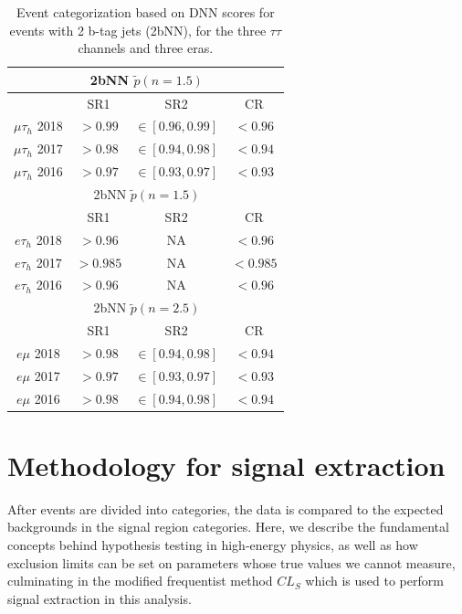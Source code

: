 \begin{table}[h!]
    \begin{center}
       \begin{tabular}{|c|c|c|c|}
       \hline
        & \multicolumn{2}{c}{2bNN $\tilde{p}(n=1.5)$} & \\
       \hline
        & SR1 & SR2 & CR \\
       \hline
       $\mu\tau_{h}$ 2018 & $>0.99$ & $\in[0.96,0.99]$ & $<0.96$ \\
       $\mu\tau_{h}$ 2017 & $>0.98$ & $\in[0.94,0.98]$ & $<0.94$ \\
       $\mu\tau_{h}$ 2016 & $>0.97$ & $\in[0.93,0.97]$ & $<0.93$ \\
       \hline
       \hline
        & \multicolumn{2}{c}{2bNN $\tilde{p}(n=1.5)$} & \\
       \hline
        & SR1 & SR2 & CR \\
       \hline
       $e\tau_{h}$ 2018 & $>0.96$ & NA & $<0.96$ \\
       $e\tau_{h}$ 2017 & $>0.985$ & NA & $<0.985$ \\
       $e\tau_{h}$ 2016 & $>0.96$ & NA & $<0.96$ \\
       \hline
       \hline
        & \multicolumn{2}{c}{2bNN $\tilde{p}(n=2.5)$} & \\
       \hline
        & SR1 & SR2 & CR \\
       \hline
       $e\mu$ 2018 & $>0.98$ & $\in[0.94,0.98]$ & $<0.94$ \\
       $e\mu$ 2017 & $>0.97$ & $\in[0.93,0.97]$ & $<0.93$ \\
       $e\mu$ 2016 & $>0.98$ & $\in[0.94,0.98]$ & $<0.94$ \\
       \hline
      \end{tabular}
    \end{center}
    \caption{Event categorization based on DNN scores for events with 2 b-tag jets (2bNN), for the three $\tau\tau$ channels and three eras.}
    \label{table:2bNN-final-categories}
\end{table}


\section{Methodology for signal extraction}
\label{section:methodology_signal_extraction}
After events are divided into categories, the data is compared to the expected backgrounds in the signal region categories. Here, we describe the fundamental concepts behind hypothesis testing in high-energy physics, as well as how exclusion limits can be set on parameters whose true values we cannot measure, culminating in the modified frequentist method $CL_{S}$ which is used to perform signal extraction in this analysis.

